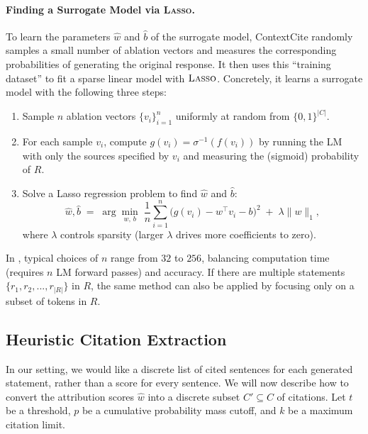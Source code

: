 \paragraph{Finding a Surrogate Model via \textsc{Lasso}.}

To learn the parameters $\hat{w}$ and $\hat{b}$ of the surrogate model, ContextCite randomly samples a small number of ablation vectors and measures the corresponding probabilities of generating the original response. 
It then uses this ``training dataset'' to fit a sparse linear model with $\textsc{Lasso}$.
Concretely, it learns a surrogate model with the following three steps:
\begin{enumerate}
    \item Sample $n$ ablation vectors $\{v_i\}_{i=1}^n$ uniformly at random from $\{0,1\}^{|C|}$.
    \item For each sample $v_i$, compute $g(v_i) = \sigma^{-1}(f(v_i))$ by running the LM with only the sources specified by $v_i$ and measuring the (sigmoid) probability of $R$.
    \item Solve a Lasso regression problem to find $\hat{w}$ and $\hat{b}$:
    \[
    \hat{w}, \hat{b} \;=\; \arg\min_{w,\,b}\; \frac{1}{n} \sum_{i=1}^n \bigl(g(v_i) - w^\top v_i - b\bigr)^2 \;+\; \lambda \|w\|_1,
    \]
    where $\lambda$ controls sparsity (larger $\lambda$ drives more coefficients to zero).
\end{enumerate}
In \citet{cohen2024contextcite}, typical choices of $n$ range from $32$ to $256$, balancing computation time (requires $n$ LM forward passes) and accuracy.
If there are multiple statements $\{r_1, r_2, ..., r_{|R|}\}$ in $R$, the same method can also be applied by focusing only on a subset of tokens in $R$.

\subsection{Heuristic Citation Extraction}
\label{subsec:heuristic}

In our setting, we would like a discrete list of cited sentences for each generated statement, rather than a score for every sentence.
We will now describe how to convert the attribution scores $\hat{w}$ into a discrete subset $C' \subseteq C$ of citations. Let $t$ be a threshold, $p$ be a cumulative probability mass cutoff, and $k$ be a maximum citation limit.

